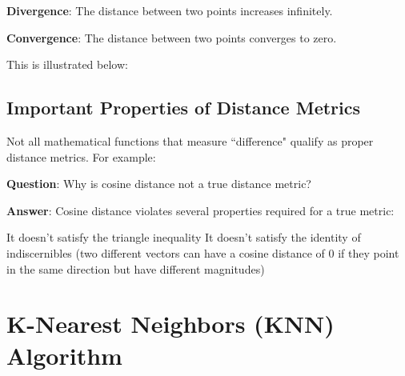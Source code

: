 \textbf{Divergence}: The distance between two points increases infinitely.

\textbf{Convergence}: The distance between two points converges to zero.

This is illustrated below:

\begin{center}
\end{center}

\subsection{Important Properties of Distance Metrics}
Not all mathematical functions that measure ``difference" qualify as proper distance metrics. For example:

\textbf{Question}: Why is cosine distance not a true distance metric?

\textbf{Answer}: Cosine distance violates several properties required for a true metric:
\begin{outline}
    \1 It doesn't satisfy the triangle inequality
    \1 It doesn't satisfy the identity of indiscernibles (two different vectors can have a cosine distance of 0 if they point in the same direction but have different magnitudes)
\end{outline}

\section{K-Nearest Neighbors (KNN) Algorithm}
